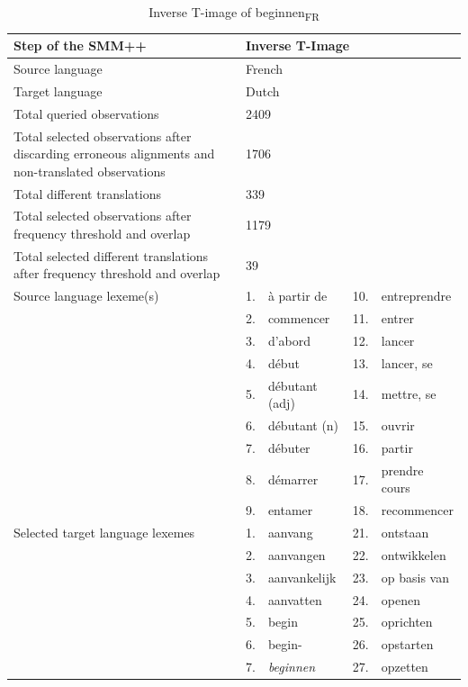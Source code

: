 \begin{table}
\caption{Inverse T-image of beginnen\textsubscript{FR}\label{tab:3:9}}
\small
\begin{tabularx}{\textwidth}{p{}lXlX}
\lsptoprule
Step of the SMM++ & \multicolumn{4}{l}{Inverse T-Image}\\ \midrule
\rowcolor{lsLightGray} Source language & \multicolumn{4}{l}{French}\\
Target language & \multicolumn{4}{l}{Dutch}\\
\rowcolor{lsLightGray} Total queried observations & \multicolumn{4}{l}{ 2409}\\
Total selected observations after discarding erroneous alignments and non-translated observations & \multicolumn{4}{l}{ 1706}\\
\rowcolor{lsLightGray} Total different translations & \multicolumn{4}{l}{ 339}\\
Total selected observations after frequency threshold and overlap & \multicolumn{4}{l}{ 1179}\\
\rowcolor{lsLightGray} Total selected different translations after frequency threshold and overlap & \multicolumn{4}{l}{ 39}\\
Source language lexeme(s) & 1.& à partir de & 10.& entreprendre\\
& 2.& commencer & 11.& entrer\\
& 3.& d'abord & 12.& lancer\\
& 4.& début & 13.& lancer, se\\
& 5.& débutant (adj) & 14.& mettre, se\\
& 6.& débutant (n) & 15.& ouvrir\\
& 7.& débuter & 16.& partir\\
& 8.& démarrer & 17.& prendre cours\\
& 9.& entamer & 18.& recommencer \\
\rowcolor{lsLightGray} Selected target language lexemes & 1. & aanvang & 21.& ontstaan\\
\rowcolor{lsLightGray}& 2.& aanvangen & 22.& ontwikkelen\\
\rowcolor{lsLightGray}& 3.& aanvankelijk & 23.& op basis van\\
\rowcolor{lsLightGray}& 4.& aanvatten & 24.& openen\\
\rowcolor{lsLightGray}& 5.& begin & 25.& oprichten\\
\rowcolor{lsLightGray}& 6.& begin- & 26.& opstarten\\
\rowcolor{lsLightGray}& 7.& \textit{beginnen} & 27.& opzetten\\

\end{tabularx}
\end{table}
